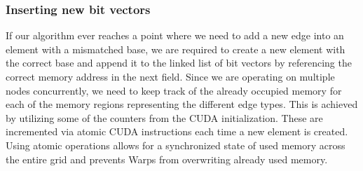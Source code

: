 \subsubsection{Inserting new bit vectors}
If our algorithm ever reaches a point where we need to add a new edge into an element with a mismatched base, we are required to create a new element with the correct base and append it to the linked list of bit vectors by referencing the correct memory address in the next field.
Since we are operating on multiple nodes concurrently, we need to keep track of the already occupied memory for each of the memory regions representing the different edge types. This is achieved by utilizing some of the counters from the CUDA initialization.
These are incremented via atomic CUDA instructions each time a new element is created.
Using atomic operations allows for a synchronized state of used memory across the entire grid and prevents Warps from overwriting already used memory.

